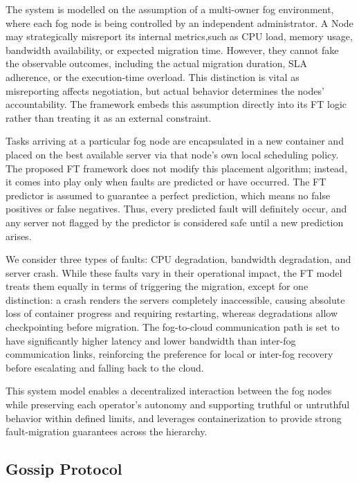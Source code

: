 \documentclass{article}
\begin{document}
The system is modelled on the assumption of a multi-owner fog environment, where each fog node is being controlled by an independent administrator. A Node may strategically misreport its internal metrics,such as CPU load, memory usage, bandwidth availability, or expected migration time. However, they cannot fake the observable outcomes, including the actual migration duration, SLA adherence, or the execution-time overload.  This distinction is vital as misreporting affects negotiation, but actual behavior determines the nodes’ accountability. The framework embeds this assumption directly into its FT logic rather than treating it as an external constraint.

Tasks arriving at a particular fog node are encapsulated in a new container and placed on the best available server via that node’s own local scheduling policy. The proposed FT framework does not modify this placement algorithm; instead, it comes into play only when faults are predicted or have occurred. The FT predictor is assumed to guarantee a perfect prediction, which means no false positives or false negatives. Thus, every predicted fault will definitely occur, and any server not flagged by the predictor is considered safe until a new prediction arises.

We consider three types of faults: CPU degradation, bandwidth degradation, and server crash. While these faults vary in their operational impact, the FT model treats them equally in terms of triggering the migration, except for one distinction: a crash renders the servers completely inaccessible, causing absolute loss of container progress and requiring restarting, whereas degradations allow checkpointing before migration. The fog-to-cloud communication path is set to have significantly higher latency and lower bandwidth than inter-fog communication links, reinforcing the preference for local or inter-fog recovery before escalating and falling back to the cloud.

This system model enables a decentralized interaction between the fog nodes while preserving each operator’s autonomy and supporting truthful or untruthful behavior within defined limits, and leverages containerization to provide strong fault-migration guarantees across the hierarchy.


\subsection{Gossip Protocol}
\end{document}
